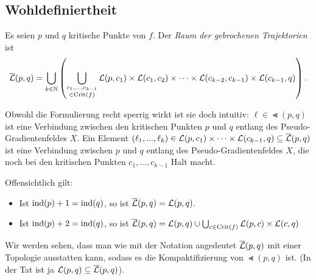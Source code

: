 \subsection*{Wohldefiniertheit}

\begin{definition}
    \label{def: raum der gebrochenen trajektorien}
    Es seien $p$ und $q$ kritische Punkte von $f$. Der \textit{Raum der gebrochenen Trajektorien} ist
    \[ {\overline{\mathcal{L}} } (p, q) = 
        \bigcup_{k \in { \mathbb N }} \left( \bigcup_{\substack{c_1, \dots, c_{k - 1} \\ \in { \operatorname{Crit} }(f)}} 
            { \mathcal{L} } (p, c_1) \times { \mathcal{L} } (c_1, c_2) \times \dots 
                \times { \mathcal{L} } (c_{k - 2}, c_{k - 1}) \times { \mathcal{L} } (c_{k - 1}, q) \right) . \]
\end{definition}

Obwohl die Formulierung recht sperrig wirkt ist sie doch intuitiv: 
$\ell \in \Lt (p, q)$ ist eine \glqq Verbindung\grqq{} zwischen den kritischen Punkten $p$ und $q$ 
entlang des Pseudo-Gradientenfeldes $X$. Ein Element 
$(\ell_1, ..., \ell_k) \in { \mathcal{L} } (p, c_1) \times \dots \times { \mathcal{L} } (c_{k - 1}, q) \subseteq {\overline{\mathcal{L}} } (p, q)$
ist eine \glqq Verbindung\grqq{} zwischen $p$ und $q$ entlang des Pseudo-Gradientenfeldes $X$, die noch 
bei den kritischen Punkten $c_1, \dots, c_{k - 1}$ \glqq Halt\grqq{} macht. 

Offensichtlich gilt:
\begin{itemize}
    \item Ist ${ \operatorname{ind} } (p) + 1 = { \operatorname{ind} } (q)$, so ist ${\overline{\mathcal{L}} } (p, q) = { \mathcal{L} } (p, q)$.
    \item Ist ${ \operatorname{ind} } (p) + 2 = { \operatorname{ind} } (q)$, so ist 
        ${\overline{\mathcal{L}} } (p, q) = { \mathcal{L} } (p, q) \cup \bigcup_{c \in { \operatorname{Crit} } (f)} { \mathcal{L} }(p, c) \times { \mathcal{L} }(c, q)$
\end{itemize}

Wir werden sehen, dass man wie mit der Notation angedeutet ${\overline{\mathcal{L}} } (p, q)$ mit einer Topologie ausstatten 
kann, sodass es die Kompaktifizierung von $\Lt (p, q)$ ist. (In der Tat ist ja 
${ \mathcal{L} } (p, q) \subseteq {\overline{\mathcal{L}} } (p, q)$).

